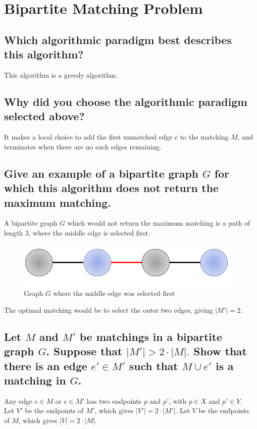 \documentclass{article}
\begin{document}
\newpage

\section{Bipartite Matching Problem}

\subsection{Which algorithmic paradigm best describes this algorithm?}  
This algorithm is a greedy algorithm.

\subsection{Why did you choose the algorithmic paradigm selected above?}
It makes a local choice to add the first unmatched edge $e$ to the matching $M$, and terminates when there are no such edges remaining.

\subsection{Give an example of a bipartite graph $G$ for which this algorithm does not return the maximum matching.}
A bipartite graph $G$ which would not return the maximum matching is a path of length 3, where the middle edge is selected first. 
\begin{figure}[h!]
	\label{Bipartite}
	\centering
	\includegraphics[scale=.5]{Images/Bipartite.png}
	\caption{Graph $G$ where the middle edge was selected first}
\end{figure}
The optimal matching would be to select the outer two edges, giving $|M'| = 2$.

\subsection{Let $M$ and $M'$ be matchings in a bipartite graph $G$.  Suppose that $|M'| > 2 \cdot |M|.$  Show that there is an edge $e' \in M'$ such that $M \cup {e'}$ is a matching in $G$.}

Any edge $e \in M$ or $e \in M'$ has two endpoints $p$ and $p'$, with $p \in X$ and $p' \in Y$.
Let $V'$ be the endpoints of $M'$, which gives $|V'| = 2 \cdot |M'|$.  
Let $V$ be the endpoints of $M$, which gives $|V| = 2 \cdot |M|$.
\end{document}

